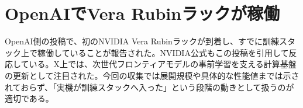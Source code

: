 \section{OpenAIでVera Rubinラックが稼働}
OpenAI側の投稿で、初のNVIDIA Vera Rubinラックが到着し、すでに訓練スタック上で稼働していることが報告された。NVIDIA公式もこの投稿を引用して反応している。X上では、次世代フロンティアモデルの事前学習を支える計算基盤の更新として注目された。今回の収集では展開規模や具体的な性能値までは示されておらず、「実機が訓練スタックへ入った」という段階の動きとして扱うのが適切である。

